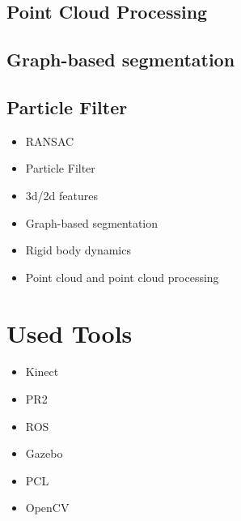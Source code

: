 \subsection{Point Cloud Processing}
\subsection{Graph-based segmentation}
\subsection{Particle Filter}

\begin{itemize}
\item RANSAC
\item Particle Filter
\item 3d/2d features
\item Graph-based segmentation
\item Rigid body dynamics
\item Point cloud and point cloud processing
\end{itemize}


\section{Used Tools}
\begin{itemize}
\item Kinect
\item PR2
\item ROS
\item Gazebo
\item PCL
\item OpenCV
\end{itemize}






